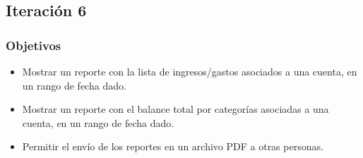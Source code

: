 %

\subsection{Iteración 6}
\subsubsection{Objetivos}
\begin{itemize}
\item Mostrar un reporte con la lista de ingresos/gastos asociados a una cuenta, en un rango de fecha dado.
\item Mostrar un reporte con el balance total por categorías asociadas a una cuenta, en un rango de fecha dado.
\item Permitir el envío de los reportes en un archivo PDF a otras personas.

\end{itemize}

